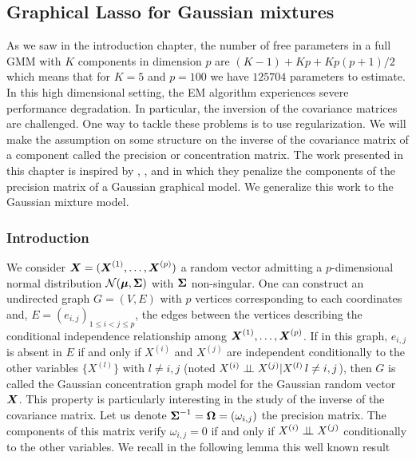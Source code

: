 \subsection{Graphical Lasso for Gaussian mixtures}\label{chapgraphlasso}

As we saw in the introduction chapter, the number of free parameters in a full GMM with $K$ components in dimension $p$ are $(K-1)+Kp+Kp(p+1)/2$ which means that for $K=5$ and $p=100$ we have $125704$ parameters to estimate. In this high dimensional setting, the EM algorithm experiences severe performance degradation. In particular, the inversion of the covariance matrices are challenged. One way to tackle these problems is to use regularization. We will make the assumption on some structure on the inverse of the covariance matrix of a component called the precision or concentration matrix. The work presented in this chapter is inspired by \citep{glasso07}, \citep{banerjee}, \citep{yuanLin_graph} and \citep{meinshausen2006} in which they penalize the components of the precision matrix of a Gaussian graphical model. We generalize this work to the Gaussian mixture model.

\subsubsection{Introduction}
We consider $\boldsymbol X=(\boldsymbol X^{(1)},\dots,\boldsymbol X^{(p)})$ a random vector admitting a $p$-dimensional normal distribution $\mathcal N(\boldsymbol\mu, \boldsymbol\Sigma)$ with $\boldsymbol\Sigma$ non-singular. One can construct an undirected graph $G=(V,E)$ with $p$ vertices corresponding to each coordinates and, $E=(e_{i,j})_{1\leq i < j \leq p}$, the edges between the vertices describing the conditional independence relationship among $\boldsymbol X^{(1)},\dots,\boldsymbol X^{(p)}$. 
If in this graph, $e_{i,j}$ is absent in $E$ if and only if $X^{(i)}$ and $X^{(j)}$ 
are independent conditionally to the other variables $\{X^{(l)}\}$ with $l\neq i,j$ (noted $X^{(i)} \perp\!\!\!\perp X^{(j)}|X^{(l)}\, l\neq i,j$), then $G$ is called the Gaussian concentration graph model for the Gaussian random vector $\boldsymbol X$. 
This property is particularly interesting in the study of the inverse of the covariance matrix. Let us denote $\boldsymbol\Sigma^{-1}=\boldsymbol\Omega=(\omega_{i,j})$ the precision matrix. The components of this matrix verify $\omega_{i,j}=0$ if and only if $X^{(i)} \perp\!\!\!\perp X^{(j)}$ conditionally to the other variables. We recall in the following lemma this well known result

